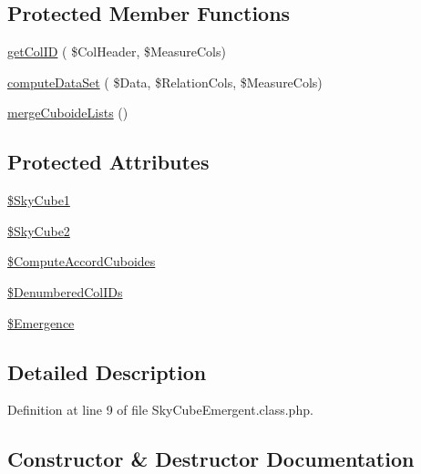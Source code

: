 \subsection*{Protected Member Functions}
\begin{DoxyCompactItemize}
\item 
\hyperlink{class_sky_cube_emergent_a3b13e5211e0263c98f434fb145f2b6d3}{get\+Col\+ID} ( \$Col\+Header, \$Measure\+Cols)
\item 
\hyperlink{class_sky_cube_emergent_acc1b45049447db94232a71cdf396336e}{compute\+Data\+Set} ( \$Data, \$Relation\+Cols, \$Measure\+Cols)
\item 
\hyperlink{class_sky_cube_emergent_a23fbbd0a04a7bcf18dad60373d400aba}{merge\+Cuboide\+Lists} ()
\end{DoxyCompactItemize}
\subsection*{Protected Attributes}
\begin{DoxyCompactItemize}
\item 
\hyperlink{class_sky_cube_emergent_a70152925382416722804a0cb230b3020}{\$\+Sky\+Cube1}
\item 
\hyperlink{class_sky_cube_emergent_a5c05d00b167717f6299f6fce9e885317}{\$\+Sky\+Cube2}
\item 
\hyperlink{class_sky_cube_emergent_a132b49893fcbee8759bb17ed4160b6ae}{\$\+Compute\+Accord\+Cuboides}
\item 
\hyperlink{class_sky_cube_emergent_acf3b11347cb2f634ed384ebfb69e1119}{\$\+Denumbered\+Col\+I\+Ds}
\item 
\hyperlink{class_sky_cube_emergent_a3977049ae3e395e840c948a4c6abb3c5}{\$\+Emergence}
\end{DoxyCompactItemize}


\subsection{Detailed Description}


Definition at line 9 of file Sky\+Cube\+Emergent.\+class.\+php.



\subsection{Constructor \& Destructor Documentation}
\mbox{\label{class_sky_cube_emergent_a89310a748541bbb5bd80d06856c1389d}} 
